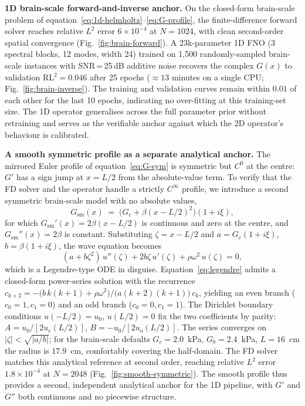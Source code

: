 \documentclass[11pt,letterpaper]{article}
\begin{document}
\textbf{1D brain-scale forward-and-inverse anchor.}
On the closed-form brain-scale problem of
equation~\eqref{eq:1d-helmholtz}--\eqref{eq:G-profile}, the
finite-difference forward solver reaches relative $L^{2}$ error
$6\!\times\!10^{-4}$ at $N=1024$, with clean second-order spatial
convergence (Fig.~\ref{fig:brain-forward}). A 23k-parameter 1D FNO
(3 spectral blocks, 12 modes, width 24) trained on 1{,}500 randomly-sampled
brain-scale instances with SNR\,=\,25\,dB additive noise recovers the
complex $G(x)$ to validation RL$^{2}=0.046$ after 25 epochs
($\approx\!13$ minutes on a single CPU; Fig.~\ref{fig:brain-inverse}). The
training and validation curves remain within $0.01$ of each other for the
last 10 epochs, indicating no over-fitting at this training-set size. The
1D operator generalises across the full parameter prior without
retraining and serves as the verifiable anchor against which the 2D
operator's behaviour is calibrated.

\textbf{A smooth symmetric profile as a separate analytical anchor.}
The mirrored Euler profile of equation~\eqref{eq:G-sym} is symmetric but
$C^{0}$ at the centre: $G'$ has a sign jump at $x = L/2$ from the
absolute-value term. To verify that the FD solver and the operator
handle a strictly $C^{\infty}$ profile, we introduce a second symmetric
brain-scale model with no absolute values,
\begin{equation}
G_{\mathrm{sm}}(x) \;=\; \bigl(G_{c}+\beta(x-L/2)^{2}\bigr)(1+i\xi),
\label{eq:G-smooth}
\end{equation}
for which $G_{\mathrm{sm}}'(x) = 2\beta(x-L/2)$ is continuous and zero
at the centre, and $G_{\mathrm{sm}}''(x) = 2\beta$ is constant.
Substituting $\zeta = x - L/2$ and $a = G_{c}(1+i\xi)$,
$b = \beta(1+i\xi)$, the wave equation becomes
\begin{equation}
(a + b\zeta^{2})\,u''(\zeta) + 2 b \zeta\,u'(\zeta) + \rho\omega^{2}\,u(\zeta) = 0,
\label{eq:legendre}
\end{equation}
which is a Legendre-type ODE in disguise. Equation~\eqref{eq:legendre}
admits a closed-form power-series solution with the recurrence
$c_{k+2} = -\bigl(b\,k(k+1) + \rho\omega^{2}\bigr)/\bigl(a(k+2)(k+1)\bigr)\,c_{k}$,
yielding an even branch ($c_{0}=1, c_{1}=0$) and an odd branch
($c_{0}=0, c_{1}=1$). The Dirichlet boundary conditions
$u(-L/2)=u_{0}$, $u(L/2)=0$ fix the two coefficients by parity:
$A=u_{0}/[2 u_{e}(L/2)]$, $B=-u_{0}/[2 u_{o}(L/2)]$. The series converges
on $|\zeta|<\sqrt{|a/b|}$; for the brain-scale defaults
$G_{c}\!=\!2.0$~kPa, $G_{b}\!=\!2.4$~kPa, $L\!=\!16$~cm the radius is
$17.9$~cm, comfortably covering the half-domain. The FD solver
matches this analytical reference at second order, reaching relative
$L^{2}$ error $1.8\!\times\!10^{-4}$ at $N=2048$
(Fig.~\ref{fig:smooth-symmetric}). The smooth profile thus provides a
second, independent analytical anchor for the 1D pipeline, with $G'$ and
$G''$ both continuous and no piecewise structure.
\end{document}
